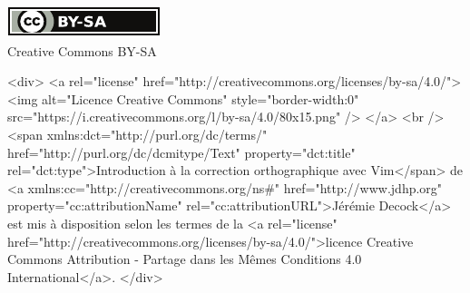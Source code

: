 \documentclass{article}
\begin{document}
\ifpdf
    \begin{center}
        \href{http://creativecommons.org/licenses/by-sa/2.0/fr/}{\includegraphics[width=.15\linewidth]{fig/cc_by_sa_small}}\\
        \small{Creative Commons BY-SA}
    \end{center}
\else
    \begin{rawhtml}

        <div>
            <a rel="license" href="http://creativecommons.org/licenses/by-sa/4.0/">
                <img alt="Licence Creative Commons" style="border-width:0" src="https://i.creativecommons.org/l/by-sa/4.0/80x15.png" />
            </a>
            <br />
            <span xmlns:dct="http://purl.org/dc/terms/" href="http://purl.org/dc/dcmitype/Text" property="dct:title" rel="dct:type">Introduction à la correction orthographique avec Vim</span> de <a xmlns:cc="http://creativecommons.org/ns#" href="http://www.jdhp.org" property="cc:attributionName" rel="cc:attributionURL">Jérémie Decock</a> est mis à disposition selon les termes de la <a rel="license" href="http://creativecommons.org/licenses/by-sa/4.0/">licence Creative Commons Attribution -  Partage dans les Mêmes Conditions 4.0 International</a>.
        </div>

    \end{rawhtml}
\fi
\end{document}
